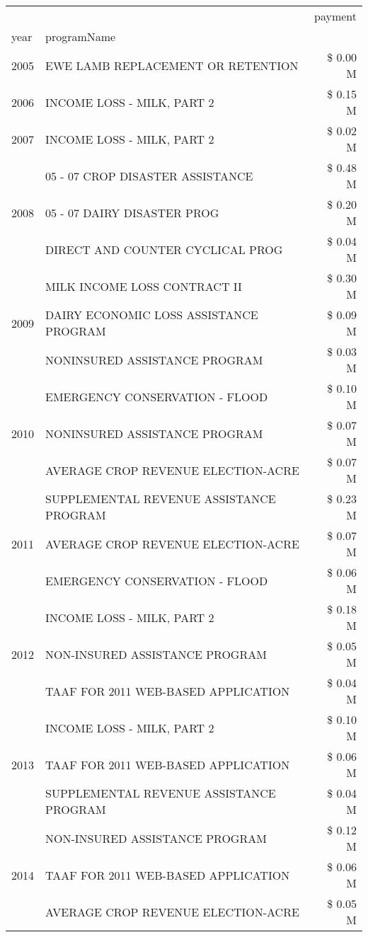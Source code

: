 \begin{tabular}{llr}
\toprule
 &  & payment \\
year & programName &  \\
\midrule
2005 & EWE LAMB REPLACEMENT OR RETENTION & \$ 0.00 M \\
\cline{1-3}
2006 & INCOME LOSS - MILK, PART 2 & \$ 0.15 M \\
\cline{1-3}
2007 & INCOME LOSS - MILK, PART 2 & \$ 0.02 M \\
\cline{1-3}
\multirow[t]{3}{*}{2008} & 05 - 07 CROP DISASTER ASSISTANCE & \$ 0.48 M \\
 & 05 - 07 DAIRY DISASTER PROG & \$ 0.20 M \\
 & DIRECT AND COUNTER CYCLICAL PROG & \$ 0.04 M \\
\cline{1-3}
\multirow[t]{3}{*}{2009} & MILK INCOME LOSS CONTRACT II & \$ 0.30 M \\
 & DAIRY ECONOMIC LOSS ASSISTANCE PROGRAM & \$ 0.09 M \\
 & NONINSURED ASSISTANCE PROGRAM & \$ 0.03 M \\
\cline{1-3}
\multirow[t]{3}{*}{2010} & EMERGENCY CONSERVATION - FLOOD & \$ 0.10 M \\
 & NONINSURED ASSISTANCE PROGRAM & \$ 0.07 M \\
 & AVERAGE CROP REVENUE ELECTION-ACRE & \$ 0.07 M \\
\cline{1-3}
\multirow[t]{3}{*}{2011} & SUPPLEMENTAL REVENUE ASSISTANCE PROGRAM & \$ 0.23 M \\
 & AVERAGE CROP REVENUE ELECTION-ACRE & \$ 0.07 M \\
 & EMERGENCY CONSERVATION - FLOOD & \$ 0.06 M \\
\cline{1-3}
\multirow[t]{3}{*}{2012} & INCOME LOSS - MILK, PART 2 & \$ 0.18 M \\
 & NON-INSURED ASSISTANCE PROGRAM & \$ 0.05 M \\
 & TAAF FOR 2011 WEB-BASED APPLICATION & \$ 0.04 M \\
\cline{1-3}
\multirow[t]{3}{*}{2013} & INCOME LOSS - MILK, PART 2 & \$ 0.10 M \\
 & TAAF FOR 2011 WEB-BASED APPLICATION & \$ 0.06 M \\
 & SUPPLEMENTAL REVENUE ASSISTANCE PROGRAM & \$ 0.04 M \\
\cline{1-3}
\multirow[t]{3}{*}{2014} & NON-INSURED ASSISTANCE PROGRAM & \$ 0.12 M \\
 & TAAF FOR 2011 WEB-BASED APPLICATION & \$ 0.06 M \\
 & AVERAGE CROP REVENUE ELECTION-ACRE & \$ 0.05 M \\

\end{tabular}
